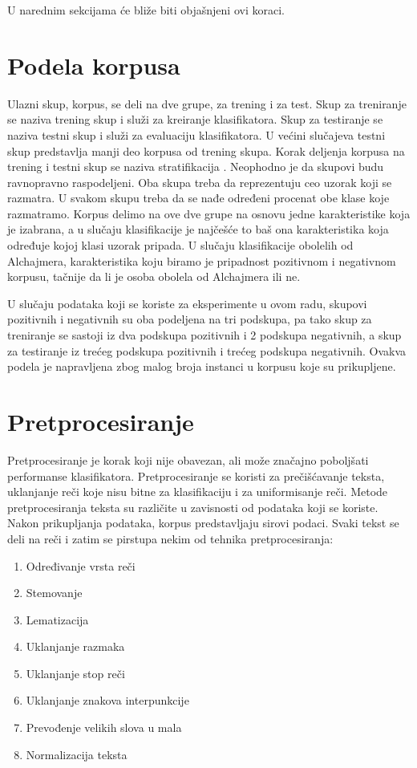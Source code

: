 \documentclass[12pt,oneside]{memoir}
\begin{document}
U narednim sekcijama će bliže biti objašnjeni ovi koraci.  

\section{Podela korpusa}

Ulazni skup, korpus, se deli na dve grupe, za trening i za test. Skup za treniranje se naziva trening skup i služi za kreiranje klasifikatora. Skup za testiranje se naziva testni skup i služi za evaluaciju klasifikatora. U većini slučajeva testni skup predstavlja manji deo korpusa od trening skupa. Korak deljenja korpusa na trening i testni skup se naziva stratifikacija \cite{MarijaMR}. Neophodno je da skupovi budu ravnopravno raspodeljeni. Oba skupa treba da reprezentuju ceo uzorak koji se razmatra. U svakom skupu treba da se nađe određeni procenat obe klase koje razmatramo. Korpus delimo na ove dve grupe na osnovu jedne karakteristike koja je izabrana, a u slučaju klasifikacije je najčešće to baš ona karakteristika koja određuje kojoj klasi uzorak pripada. U slučaju klasifikacije obolelih od Alchajmera, karakteristika koju biramo je pripadnost pozitivnom i negativnom korpusu, tačnije da li je osoba obolela od Alchajmera ili ne.  

U slučaju podataka koji se koriste za eksperimente u ovom radu, skupovi pozitivnih i negativnih su oba podeljena na tri podskupa, pa tako skup za treniranje se sastoji iz dva podskupa pozitivnih i 2 podskupa negativnih, a skup za testiranje iz trećeg podskupa pozitivnih i trećeg podskupa negativnih. Ovakva podela je napravljena zbog malog broja instanci u korpusu koje su prikupljene.

\section{Pretprocesiranje}
 
Pretprocesiranje je korak koji nije obavezan, ali može značajno poboljšati performanse klasifikatora. Pretprocesiranje se koristi za prečišćavanje teksta, uklanjanje reči koje nisu bitne za klasifikaciju i za uniformisanje reči. Metode pretprocesiranja teksta su različite u zavisnosti od podataka koji se koriste. Nakon prikupljanja podataka, korpus predstavljaju sirovi podaci. Svaki tekst se deli na reči i zatim se pirstupa nekim od tehnika pretprocesiranja:

\begin{enumerate}
\item Određivanje vrsta reči
\item Stemovanje
\item Lematizacija
\item Uklanjanje razmaka
\item Uklanjanje stop reči
\item Uklanjanje znakova interpunkcije
\item Prevođenje velikih slova u mala
\item Normalizacija teksta
\end{enumerate}
\end{document}
